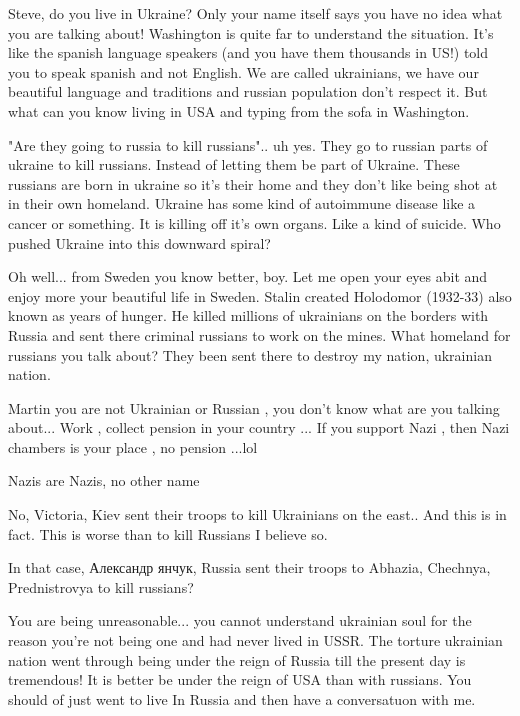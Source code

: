 \begin{itemize}
\begin{itemize}

Steve, do you live in Ukraine? Only your name itself says you have no idea what
you are talking about! Washington is quite far to understand the situation.
It's like the spanish language speakers (and you have them thousands in US!)
told you to speak spanish and not English. We are called ukrainians, we have
our beautiful language and traditions and russian population don't respect it.
But what can you know living in USA and typing from the sofa in Washington.


"Are they going to russia to kill russians".. uh yes. They go to russian parts
of ukraine to kill russians. Instead of letting them be part of Ukraine. These
russians are born in ukraine so it's their home and they don't like being shot
at in their own homeland. Ukraine has some kind of autoimmune disease like a
cancer or something. It is killing off it's own organs. Like a kind of suicide.
Who pushed Ukraine into this downward spiral?


Oh well... from Sweden you know better, boy. Let me open your eyes abit and
enjoy more your beautiful life in Sweden. Stalin created Holodomor (1932-33)
also known as years of hunger. He killed millions of ukrainians on the borders
with Russia and sent there criminal russians to work on the mines. What
homeland for russians you talk about? They been sent there to destroy my
nation, ukrainian nation.


Martin you are not Ukrainian or Russian , you don't know what are you talking
about... Work , collect pension in your country ... If you support Nazi , then
Nazi chambers is your place , no pension ...lol

Nazis are Nazis, no other name

No, Victoria, Kiev sent their troops to kill Ukrainians on the east.. And this is in fact. This is worse than to kill Russians I believe so.

In that case, Александр янчук, Russia sent their troops to Abhazia, Chechnya, Prednistrovya to kill russians?


You are being unreasonable... you cannot understand ukrainian soul for the
reason you're not being one and had never lived in USSR. The torture ukrainian
nation went through being under the reign of Russia till the present day is
tremendous! It is better be under the reign of USA than with russians. You
should of just went to live In Russia and then have a conversatuon with me.


\end{itemize}
\end{itemize}
